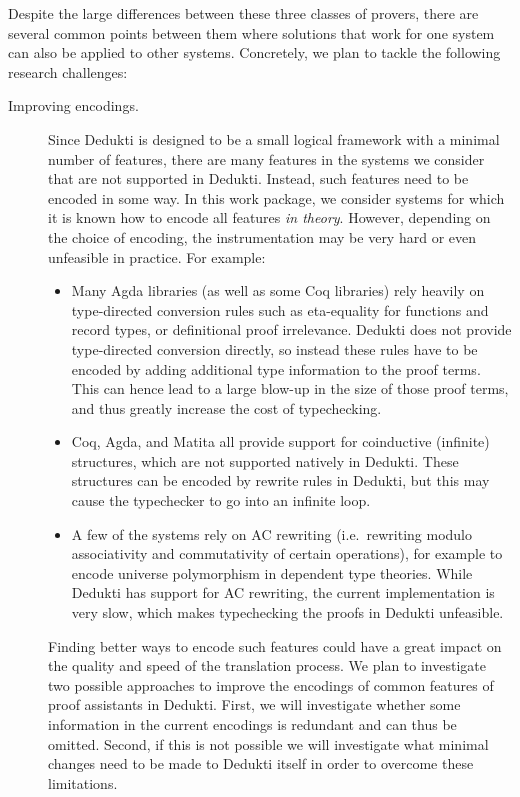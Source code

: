 Despite the large differences between these three classes of provers,
there are several common points between them where solutions that work
for one system can also be applied to other systems.
%
Concretely, we plan to tackle the following
research challenges:
\begin{description}

\item[Improving encodings.] Since Dedukti is designed to be a small
  logical framework with a minimal number of features, there are many
  features in the systems we consider that are not supported in
  Dedukti. Instead, such features need to be encoded in some way. In
  this work package, we consider systems for which it is known how to
  encode all features \emph{in theory}. However, depending on the
  choice of encoding, the instrumentation may be very hard or even
  unfeasible in practice. For example:
  \begin{itemize}

    \item Many Agda libraries (as well as some Coq libraries) rely
    heavily on type-directed conversion rules such as eta-equality for
    functions and record types, or definitional proof
    irrelevance. Dedukti does not provide type-directed conversion
    directly, so instead these rules have to be encoded by adding
    additional type information to the proof terms. This can hence
    lead to a large blow-up in the size of those proof terms, and thus
    greatly increase the cost of typechecking.

    \item Coq, Agda, and Matita all provide support for coinductive
    (infinite) structures, which are not supported natively in
    Dedukti. These structures can be encoded by rewrite rules in
    Dedukti, but this may cause the typechecker to go into an infinite
    loop.

    \item A few of the systems rely on AC rewriting (i.e.~rewriting
    modulo associativity and commutativity of certain operations), for
    example to encode universe polymorphism in dependent type
    theories. While Dedukti has support for AC rewriting, the current
    implementation is very slow, which makes typechecking the proofs
    in Dedukti unfeasible.

  \end{itemize}
  Finding better ways to encode such features could have a great
  impact on the quality and speed of the translation process.  We plan
  to investigate two possible approaches to improve the encodings of
  common features of proof assistants in Dedukti. First, we will
  investigate whether some information in the current encodings is
  redundant and can thus be omitted. Second, if this is not possible
  we will investigate what minimal changes need to be made to Dedukti
  itself in order to overcome these limitations.


\end{description}

